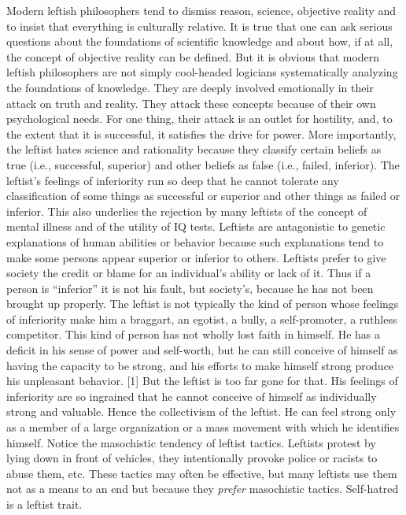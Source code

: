  Modern leftish philosophers tend to dismiss reason, science, objective reality and to insist that everything is culturally relative. It is true that one can ask serious questions about the foundations of scientific knowledge and about how, if at all, the concept of objective reality can be defined. But it is obvious that modern leftish philosophers are not simply cool-headed logicians systematically analyzing the foundations of knowledge. They are deeply involved emotionally in their attack on truth and reality. They attack these concepts because of their own psychological needs. For one thing, their attack is an outlet for hostility, and, to the extent that it is successful, it satisfies the drive for power. More importantly, the leftist hates science and rationality because they classify certain beliefs as true (i.e., successful, superior) and other beliefs as false (i.e., failed, inferior). The leftist’s feelings of inferiority run so deep that he cannot tolerate any classification of some things as successful or superior and other things as failed or inferior. This also underlies the rejection by many leftists of the concept of mental illness and of the utility of IQ tests. Leftists are antagonistic to genetic explanations of human abilities or behavior because such explanations tend to make some persons appear superior or inferior to others. Leftists prefer to give society the credit or blame for an individual’s ability or lack of it. Thus if a person is “inferior” it is not his fault, but society’s, because he has not been brought up properly.
 The leftist is not typically the kind of person whose feelings of inferiority make him a braggart, an egotist, a bully, a self-promoter, a ruthless competitor. This kind of person has not wholly lost faith in himself. He has a deficit in his sense of power and self-worth, but he can still conceive of himself as having the capacity to be strong, and his efforts to make himself strong produce his unpleasant behavior. [1] But the leftist is too far gone for that. His feelings of inferiority are so ingrained that he cannot conceive of himself as individually strong and valuable. Hence the collectivism of the leftist. He can feel strong only as a member of a large organization or a mass movement with which he identifies himself.
 Notice the masochistic tendency of leftist tactics. Leftists protest by lying down in front of vehicles, they intentionally provoke police or racists to abuse them, etc. These tactics may often be effective, but many leftists use them not as a means to an end but because they {\em prefer} masochistic tactics. Self-hatred is a leftist trait.
